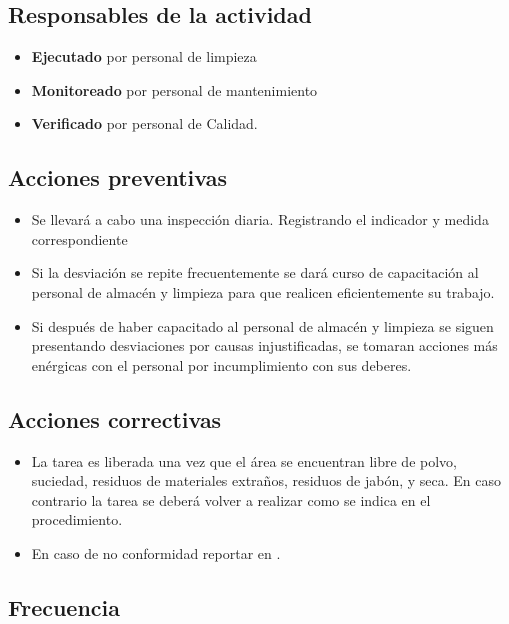\subsection{Responsables de la actividad}

\begin{itemize}
	\item \textbf{Ejecutado} por personal de limpieza
	\item \textbf{Monitoreado} por personal de mantenimiento
	\item \textbf{Verificado} por personal de Calidad.
\end{itemize}

\subsection{Acciones preventivas} %

\begin{itemize}
	\item Se llevará a cabo una inspección diaria. Registrando el indicador y medida correspondiente
	\item Si la desviación se repite frecuentemente se dará curso de capacitación al personal de almacén y limpieza para que realicen eficientemente su trabajo.
	\item Si después de haber capacitado al personal de almacén y limpieza se siguen presentando desviaciones por causas injustificadas, se tomaran acciones más enérgicas con el personal por incumplimiento con sus deberes.
\end{itemize}

\subsection{Acciones correctivas}

\begin{itemize}
	\item La tarea es liberada una vez que el área se encuentran libre de polvo, suciedad, residuos de materiales extraños, residuos de jabón, y seca. En caso contrario la tarea se deberá volver a realizar como se indica en el procedimiento. 
	\item En caso de no conformidad reportar en \RAC.
\end{itemize}

\subsection{Frecuencia}

